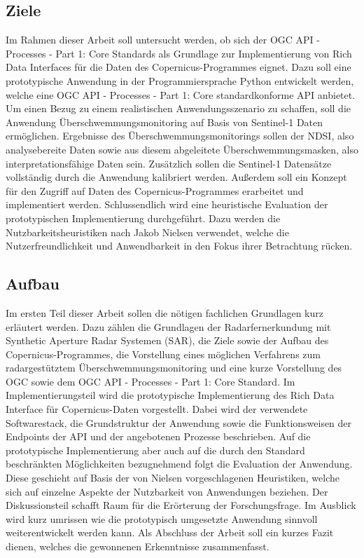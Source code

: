 \subsection{Ziele}
Im Rahmen dieser Arbeit soll untersucht werden, ob sich der OGC API - Processes - Part 1: Core Standards als Grundlage zur Implementierung von Rich Data Interfaces für die 
Daten des Copernicus-Programmes eignet.  
Dazu soll eine prototypische Anwendung in der Programmiersprache Python entwickelt werden, welche eine OGC API - Processes - Part 1: Core standardkonforme API anbietet. 
Um einen Bezug zu einem realistischen Anwendungsszenario zu schaffen, soll die Anwendung Überschwemmungsmonitoring auf Basis von Sentinel-1 Daten ermöglichen. 
Ergebnisse des Überschwemmungsmonitorings sollen der NDSI, also analysebereite Daten sowie aus diesem abgeleitete Überschwemmungsmasken, also interpretationsfähige
Daten sein.
Zusätzlich sollen die Sentinel-1 Datensätze vollständig durch die Anwendung kalibriert werden.
Außerdem soll ein Konzept für den Zugriff auf Daten des Copernicus-Programmes erarbeitet und implementiert werden.
Schlussendlich wird eine heuristische Evaluation der prototypischen Implementierung durchgeführt. 
Dazu werden die Nutzbarkeitsheuristiken nach Jakob Nielsen verwendet, welche die Nutzerfreundlichkeit und Anwendbarkeit in den Fokus ihrer Betrachtung rücken.

\subsection{Aufbau} 
Im ersten Teil dieser Arbeit sollen die nötigen fachlichen Grundlagen kurz erläutert werden. Dazu zählen die Grundlagen der Radarfernerkundung mit 
Synthetic Aperture Radar Systemen (SAR), die Ziele sowie der Aufbau des Copernicus-Programmes, 
die Vorstellung eines möglichen Verfahrens zum radargestütztem Überschwemmungsmonitoring und eine kurze Vorstellung des OGC sowie dem 
OGC API - Processes - Part 1: Core Standard. 
Im Implementierungsteil wird die prototypische Implementierung des Rich Data Interface für Copernicus-Daten vorgestellt. Dabei wird der verwendete Softwarestack, 
die Grundstruktur der Anwendung sowie die Funktionsweisen der Endpoints der API und der angebotenen Prozesse beschrieben. 
Auf die prototypische Implementierung aber auch auf die durch den Standard beschränkten Möglichkeiten bezugnehmend folgt die Evaluation der Anwendung. Diese 
geschieht auf Basis der von Nielsen vorgeschlagenen Heuristiken, welche sich auf einzelne Aspekte der Nutzbarkeit von Anwendungen beziehen. 
Der Diskussionsteil schafft Raum für die Erörterung der Forschungsfrage. Im Ausblick wird kurz umrissen wie die prototypisch umgesetzte Anwendung 
sinnvoll weiterentwickelt werden kann. Als Abschluss der Arbeit soll ein kurzes Fazit dienen, welches die gewonnenen Erkenntnisse zusammenfasst. 




